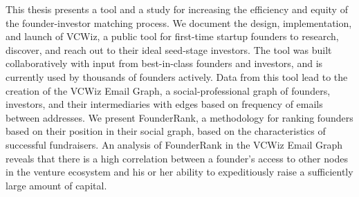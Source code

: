 %
%
%
This thesis presents a tool and a study for increasing the efficiency and equity of the founder-investor matching process. We document the design, implementation, and launch of VCWiz, a public tool for first-time startup founders to research, discover, and reach out to their ideal seed-stage investors. The tool was built collaboratively with input from best-in-class founders and investors, and is currently used by thousands of founders actively. Data from this tool lead to the creation of the VCWiz Email Graph, a social-professional graph of founders, investors, and their intermediaries with edges based on frequency of emails between addresses. We present FounderRank, a methodology for ranking founders based on their position in their social graph, based on the characteristics of successful fundraisers. An analysis of FounderRank in the VCWiz Email Graph reveals that there is a high correlation between a founder's access to other nodes in the venture ecosystem and his or her ability to expeditiously raise a sufficiently large amount of capital.
